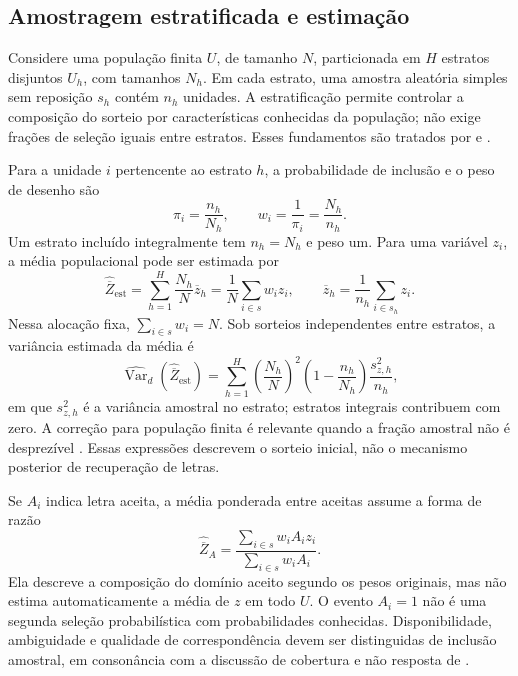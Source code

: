 \subsection{Amostragem estratificada e estimação}
Considere uma população finita $U$, de tamanho $N$, particionada em $H$ estratos disjuntos $U_h$, com tamanhos $N_h$. Em cada estrato, uma amostra aleatória simples sem reposição $s_h$ contém $n_h$ unidades. A estratificação permite controlar a composição do sorteio por características conhecidas da população; não exige frações de seleção iguais entre estratos. Esses fundamentos são tratados por  e .

Para a unidade $i$ pertencente ao estrato $h$, a probabilidade de inclusão e o peso de desenho são
\begin{equation}\label{eq:inclusao}
 \pi_i=\frac{n_h}{N_h},\qquad w_i=\frac{1}{\pi_i}=\frac{N_h}{n_h}.
\end{equation}
Um estrato incluído integralmente tem $n_h=N_h$ e peso um. Para uma variável $z_i$, a média populacional pode ser estimada por
\begin{equation}\label{eq:mediaestratificada}
 \widehat{\overline Z}_{\mathrm{est}}
 =\sum_{h=1}^{H}\frac{N_h}{N}\overline z_h
 =\frac{1}{N}\sum_{i\in s}w_i z_i,
 \qquad\overline z_h=\frac{1}{n_h}\sum_{i\in s_h}z_i.
\end{equation}
Nessa alocação fixa, $\sum_{i\in s}w_i=N$. Sob sorteios independentes entre estratos, a variância estimada da média é
\begin{equation}\label{eq:varianciaestratificada}
 \widehat{\operatorname{Var}}_d(\widehat{\overline Z}_{\mathrm{est}})
 =\sum_{h=1}^{H}\left(\frac{N_h}{N}\right)^2
 \left(1-\frac{n_h}{N_h}\right)\frac{s_{z,h}^2}{n_h},
\end{equation}
em que $s_{z,h}^2$ é a variância amostral no estrato; estratos integrais contribuem com zero. A correção para população finita é relevante quando a fração amostral não é desprezível \cite{cochran1977}. Essas expressões descrevem o sorteio inicial, não o mecanismo posterior de recuperação de letras.

Se $A_i$ indica letra aceita, a média ponderada entre aceitas assume a forma de razão
\begin{equation}\label{eq:mediaaceitas}
 \widehat{\overline Z}_A=\frac{\sum_{i\in s}w_i A_i z_i}{\sum_{i\in s}w_i A_i}.
\end{equation}
Ela descreve a composição do domínio aceito segundo os pesos originais, mas não estima automaticamente a média de $z$ em todo $U$. O evento $A_i=1$ não é uma segunda seleção probabilística com probabilidades conhecidas. Disponibilidade, ambiguidade e qualidade de correspondência devem ser distinguidas de inclusão amostral, em consonância com a discussão de cobertura e não resposta de .

